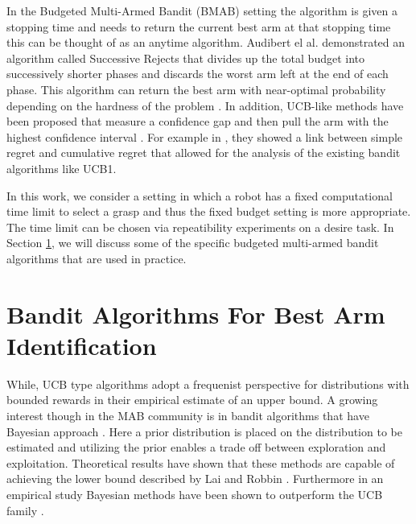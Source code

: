 \documentclass[journal,transmag]{IEEEtran}%
\begin{document}
In the Budgeted Multi-Armed Bandit (BMAB) setting the algorithm is given a stopping time and needs to return the current best arm at that stopping time this can be thought of as an anytime algorithm.   Audibert el al. demonstrated an algorithm called Successive Rejects that divides up the total budget into successively shorter phases and discards the worst arm left at the end of each phase. This algorithm can return the best arm with near-optimal probability depending on the hardness of the problem \cite{audibert2010best}. In addition, UCB-like methods have been proposed that measure a confidence gap and then pull the arm with the highest confidence interval \cite{gabillon2012best}. For example in \cite{bubeck2009pure}, they showed a link between simple regret and cumulative regret that allowed for the analysis of the existing bandit algorithms like UCB1.

In this work, we consider a setting in which a robot has a fixed computational time limit to select a grasp and thus the fixed budget setting is more appropriate. The time limit can be chosen via repeatibility experiments on a desire task. In Section \ref{sec:bandit_algorithm}, we will discuss some of the specific budgeted multi-armed bandit algorithms that are used in practice. 


\section{Bandit Algorithms For Best Arm Identification}\label{sec:bandit_algorithm}


While, UCB type algorithms adopt a frequenist perspective for distributions with bounded rewards in their empirical estimate of an upper bound. A growing interest though in the MAB community is in bandit algorithms that have Bayesian approach \cite{kaufmann2012bayesian} \cite{agrawal2011analysis}. Here a prior distribution is placed on the distribution to be estimated and utilizing the prior enables a trade off between exploration and exploitation. Theoretical results have shown that these methods are capable of achieving the lower bound described by Lai and Robbin \cite{agrawal2011analysis} \cite{kaufmann2012bayesian}. Furthermore in an empirical study Bayesian methods have been shown to outperform the UCB family \cite{chapelle2011empirical}.  
\end{document}
